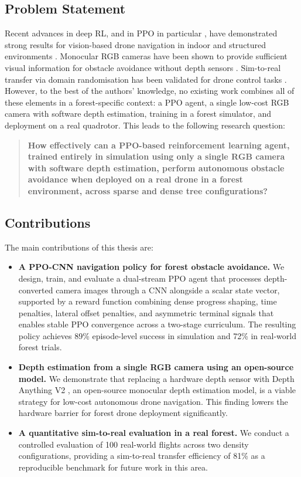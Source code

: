 \documentclass[../main.tex]{subfiles}
\begin{document}
\subsection{Problem Statement}

Recent advances in deep RL, and in PPO in particular \cite{Schulman2017}, have demonstrated strong results for vision-based drone navigation in indoor and structured environments \cite{Khanzada2025,Vizzotto2025,Tayar2025,Kabas2022}. Monocular RGB cameras have been shown to provide sufficient visual information for obstacle avoidance without depth sensors \cite{Kumar2023,Kalidas2023,Kabas2022}. Sim-to-real transfer via domain randomisation has been validated for drone control tasks \cite{Zhao2020,Salvato2021,Loquercio2019,Jang2024}. However, to the best of the authors' knowledge, no existing work combines all of these elements in a forest-specific context: a PPO agent, a single low-cost RGB camera with software depth estimation, training in a forest simulator, and deployment on a real quadrotor. This leads to the following research question:

\begin{quote}
    \textbf{How effectively can a PPO-based reinforcement learning agent, trained entirely in simulation using only a single RGB camera with software depth estimation, perform autonomous obstacle avoidance when deployed on a real drone in a forest environment, across sparse and dense tree configurations?}
\end{quote}

\subsection{Contributions}

The main contributions of this thesis are:

\begin{itemize}
    \item \textbf{A PPO-CNN navigation policy for forest obstacle avoidance.} We design, train, and evaluate a dual-stream PPO agent that processes depth-converted camera images through a CNN alongside a scalar state vector, supported by a reward function combining dense progress shaping, time penalties, lateral offset penalties, and asymmetric terminal signals that enables stable PPO convergence across a two-stage curriculum. The resulting policy achieves 89\% episode-level success in simulation and 72\% in real-world forest trials.
    \item \textbf{Depth estimation from a single RGB camera using an open-source model.} We demonstrate that replacing a hardware depth sensor with Depth Anything V2 \cite{Yang2024DepthAnythingV2}, an open-source monocular depth estimation model, is a viable strategy for low-cost autonomous drone navigation. This finding lowers the hardware barrier for forest drone deployment significantly.
    \item \textbf{A quantitative sim-to-real evaluation in a real forest.} We conduct a controlled evaluation of 100 real-world flights across two density configurations, providing a sim-to-real transfer efficiency of 81\% as a reproducible benchmark for future work in this area.
\end{itemize}
\end{document}
